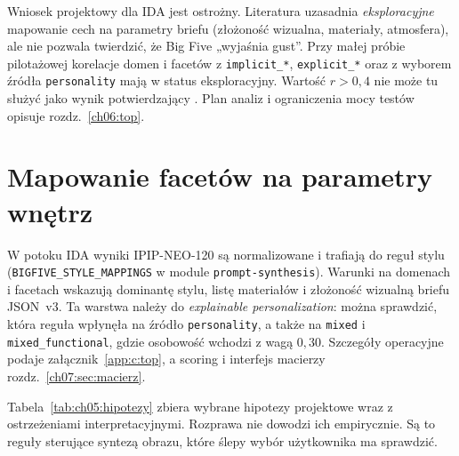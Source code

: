 Wniosek projektowy dla IDA jest ostrożny. Literatura uzasadnia \emph{eksploracyjne} mapowanie cech na parametry briefu (złożoność wizualna, materiały, atmosfera), ale nie pozwala twierdzić, że Big Five „wyjaśnia gust”.
Przy małej próbie pilotażowej korelacje domen i facetów z \texttt{implicit\_*}, \texttt{explicit\_*} oraz z wyborem źródła \texttt{personality} mają w  status eksploracyjny. Wartość $r\!>\!0{,}4$ nie może tu służyć jako wynik potwierdzający \parencite{idaPlatform2026}.
Plan analiz i ograniczenia mocy testów opisuje rozdz.~\ref{ch06:top}.

\section{Mapowanie facetów na parametry wnętrz}
\label{ch05:sec:mapowanie}

W potoku IDA wyniki IPIP-NEO-120 są normalizowane i trafiają do reguł stylu (\texttt{BIGFIVE\_STYLE\_MAPPINGS} w module \texttt{prompt-synthesis}).
Warunki na domenach i facetach wskazują dominantę stylu, listę materiałów i złożoność wizualną briefu JSON~v3.
Ta warstwa należy do \emph{explainable personalization}: można sprawdzić, która reguła wpłynęła na źródło \texttt{personality}, a także na \texttt{mixed} i \texttt{mixed\_functional}, gdzie osobowość wchodzi z wagą $0{,}30$.
Szczegóły operacyjne podaje załącznik~\ref{app:c:top}, a scoring i interfejs macierzy rozdz.~\ref{ch07:sec:macierz}.

Tabela~\ref{tab:ch05:hipotezy} zbiera wybrane hipotezy projektowe wraz z ostrzeżeniami interpretacyjnymi. Rozprawa nie dowodzi ich empirycznie.
Są to reguły sterujące syntezą obrazu, które ślepy wybór użytkownika ma sprawdzić.

